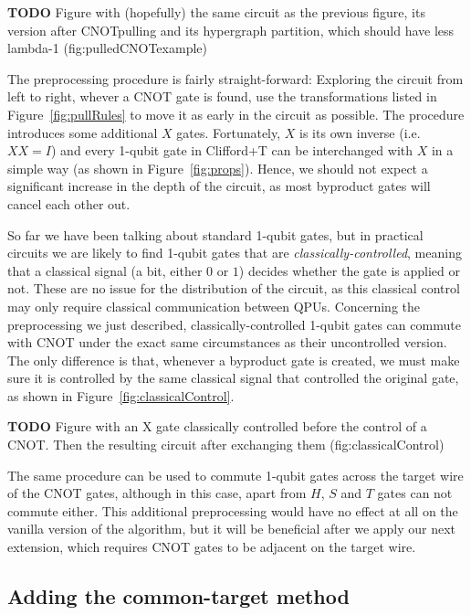 \textbf{TODO} Figure with (hopefully) the same circuit as the previous figure, its version after CNOTpulling and its hypergraph partition, which should have less lambda-1 (fig:pulledCNOTexample)

The preprocessing procedure is fairly straight-forward: Exploring the circuit from left to right, whever a CNOT gate is found, use the transformations listed in Figure~\ref{fig:pullRules} to move it as early in the circuit as possible. The procedure introduces some additional \(X\) gates. Fortunately, \(X\) is its own inverse (i.e.\ \(XX = I\)) and every 1-qubit gate in Clifford+T can be interchanged with \(X\) in a simple way (as shown in Figure~\ref{fig:props}). Hence, we should not expect a significant increase in the depth of the circuit, as most byproduct gates will cancel each other out.

So far we have been talking about standard 1-qubit gates, but in practical circuits we are likely to find 1-qubit gates that are \textit{classically-controlled}, meaning that a classical signal (a bit, either \(0\) or \(1\)) decides whether the gate is applied or not. These are no issue for the distribution of the circuit, as this classical control may only require classical communication between QPUs. Concerning the preprocessing we just described, classically-controlled 1-qubit gates can commute with CNOT under the exact same circumstances as their uncontrolled version. The only difference is that, whenever a byproduct gate is created, we must make sure it is controlled by the same classical signal that controlled the original gate, as shown in Figure~\ref{fig:classicalControl}.

\textbf{TODO} Figure with an X gate classically controlled before the control of a CNOT. Then the resulting circuit after exchanging them (fig:classicalControl)

The same procedure can be used to commute 1-qubit gates across the target wire of the CNOT gates, although in this case, apart from \(H\), \(S\) and \(T\) gates can not commute either. This additional preprocessing would have no effect at all on the vanilla version of the algorithm, but it will be beneficial after we apply our next extension, which requires CNOT gates to be adjacent on the target wire.


\subsection{Adding the common-target method}
\label{BothEnds}

